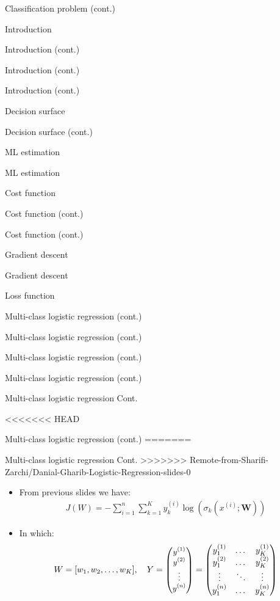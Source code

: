 \documentclass[serif, aspectratio=169]{beamer}
\begin{document}
\begin{frame}{Classification problem (cont.)}
\begin{itemize}
\begin{frame}{Introduction}
\begin{itemize}
\begin{frame}{Introduction (cont.)}
\begin{frame}{Introduction (cont.)}
\begin{frame}{Introduction (cont.)}
\begin{frame}{Decision surface}
\begin{itemize}
\begin{frame}{Decision surface (cont.)}
\begin{frame}{ML estimation}
\begin{frame}{ML estimation}
\begin{itemize}
\begin{frame}{Cost function}
\begin{frame}{Cost function (cont.)}
\begin{itemize}
\begin{itemize}
\begin{frame}{Cost function (cont.)}
\begin{frame}{Gradient descent}
\begin{frame}{Gradient descent}
\begin{frame}{Loss function}
\begin{frame}{Multi-class logistic regression (cont.)}
\begin{frame}{Multi-class logistic regression (cont.)}
\begin{frame}{Multi-class logistic regression (cont.)}
\begin{frame}{Multi-class logistic regression (cont.)}
\begin{frame}{Multi-class logistic regression Cont.}
\end{frame}
<<<<<<< HEAD
\begin{frame}{Multi-class logistic regression (cont.)}
=======
\begin{frame}{Multi-class logistic regression Cont.}
>>>>>>> Remote-from-Sharifi-Zarchi/Danial-Gharib-Logistic-Regression-slides-0
    \begin{itemize}
        \item From previous slides we have:
            \begin{align*}
                J(W) = -\sum_{i=1}^{n}\sum_{k=1}^{K}y_k^{(i)} \log (\sigma _k(x^{(i)}; \mathbf{W}))
            \end{align*}
        \item In which:
             \[
        W = [w_1,w_2, \dots, w_K], \quad Y = 
        \text{\small $
        \begin{pmatrix}
            y^{(1)} \\
            y^{(2)} \\
            \vdots \\
            y^{(n)}
        \end{pmatrix}
        $}
        =
        \begin{pmatrix}
            y_1^{(1)} & \dots & y_K^{(1)} \\
            y_1^{(2)} & \dots & y_K^{(2)} \\
            \vdots    & \ddots & \vdots \\
            y_1^{(n)} & \dots & y_K^{(n)}
        \end{pmatrix}
    \]
    

\end{itemize}
\end{frame}
\end{frame}
\end{frame}
\end{frame}
\end{frame}
\end{frame}
\end{frame}
\end{frame}
\end{frame}
\end{frame}
\end{itemize}
\end{itemize}
\end{frame}
\end{frame}
\end{itemize}
\end{frame}
\end{frame}
\end{frame}
\end{itemize}
\end{frame}
\end{frame}
\end{frame}
\end{frame}
\end{itemize}
\end{frame}
\end{itemize}
\end{frame}
\end{document}

